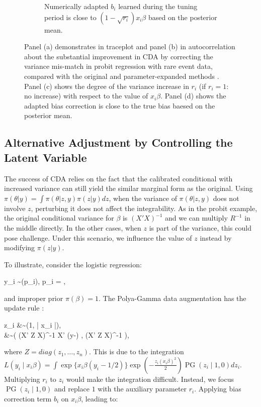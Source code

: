\documentclass[10pt]{article}
\newcommand{\xbeta}{ x_i \beta}
\newcommand{\be}{\begin{equs}}
\newcommand{\ee}{\end{equs}}
\DeclareMathOperator{\No}{No}
\DeclareMathOperator{\PG}{PG}
\DeclareMathOperator{\Bern}{Bernoulli}
\begin{document}
\begin{figure}[H]
\begin{subfigure}[b]{0.49\textwidth}
  \caption{Numerically adapted $b_i$ learned during the tuning period is close to $(1-\sqrt{r_i} ) \xbeta$ based on the posterior mean.}
      \label{probit_reg_b}
\end{subfigure}
 \caption{Panel (a) demonstrates in traceplot and panel (b) in autocorrelation about the substantial improvement in CDA by correcting the variance mis-match in probit regression with rare event data, compared with the original \citep{albert1993bayesian} and parameter-expanded methods \citep{liu1999parameter}. Panel (c) shows the degree of the variance increase in $r_i$ (if $r_i=1$: no increase) with respect to the value of $\xbeta$. Panel (d) shows the adapted bias correction is close to the true bias baesed on the posterior mean.}
 \end{figure}

\subsection{Alternative Adjustment by Controlling the Latent Variable}

The success of CDA relies on the fact that the calibrated conditional with increased variance can still yield the similar marginal form as the original. Using $\pi(\theta|y)=\int\pi(\theta|z,y)\pi(z|y) dz$, when the variance of $\pi(\theta|z,y)$ does not involve $z$, perturbing it does not affect the integrability. As in the probit example, the original conditional variance for $\beta$ is $(X'X)^{-1}$ and we can multiply $R^{-1}$ in the middle directly. In the other cases, when $z$ is part of the variance, this could pose challenge. Under this scenario, we influence the value of $z$ instead by modifying $\pi(z|y)$.

To illustrate, consider the logistic regression:

\be
y_i \sim \Bern(p_i), \quad p_i = ,
\ee
and improper prior $\pi(\beta)=1$. The Polya-Gamma data augmentation has the update rule \citep{polson2013bayesian}:

\be
 z_i &\sim {\PG}(1, |\xbeta|),\\
\beta &\sim \No \left(  (X' Z X)^{-1}   X'  (y-)  ,  (X' Z X)^{-1}  \right),
\ee
where $Z= diag(z_1,\ldots,z_n)$. This is due to the integration $L(y_i \mid \xbeta)=  \int \exp\{ \xbeta (y_i-1/2)\} \exp(-\frac{z_i (\xbeta)^2}{2}) \PG(z_i \mid 1,0) dz_i$. Multiplying $r_i$ to $z_i$ would make the integration difficult. Instead, we focus $\PG(z_i \mid 1,0)$ and replace $1$ with the auxiliary parameter $r_i$. Applying bias correction term $b_i$ on $\xbeta$, leading to:
\end{document}
